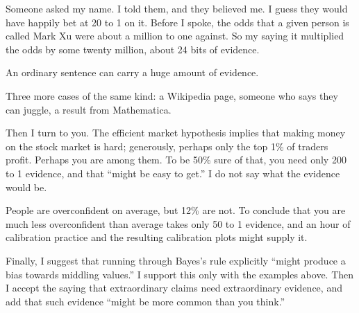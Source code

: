 
Someone asked my name. I told them, and they believed me. I guess they would have happily bet at 20 to 1 on it. Before I spoke, the odds that a given person is called Mark Xu were about a million to one against. So my saying it multiplied the odds by some twenty million, about 24 bits of evidence.

An ordinary sentence can carry a huge amount of evidence. 

Three more cases of the same kind: a Wikipedia page, someone who says they can juggle, a result from Mathematica. 

Then I turn to you. The efficient market hypothesis implies that making money on the stock market is hard; generously, perhaps only the top 1\% of traders profit. Perhaps you are among them. To be 50\% sure of that, you need only 200 to 1 evidence, and that ``might be easy to get.'' I do not say what the evidence would be. 

People are overconfident on average, but 12\% are not. To conclude that you are much less overconfident than average takes only 50 to 1 evidence, and an hour of calibration practice and the resulting calibration plots might supply it.


Finally, I suggest that running through Bayes's rule explicitly ``might produce a bias towards middling values.'' I support this only with the examples above. Then I accept the saying that extraordinary claims need extraordinary evidence, and add that such evidence ``might be more common than you think.'' 
